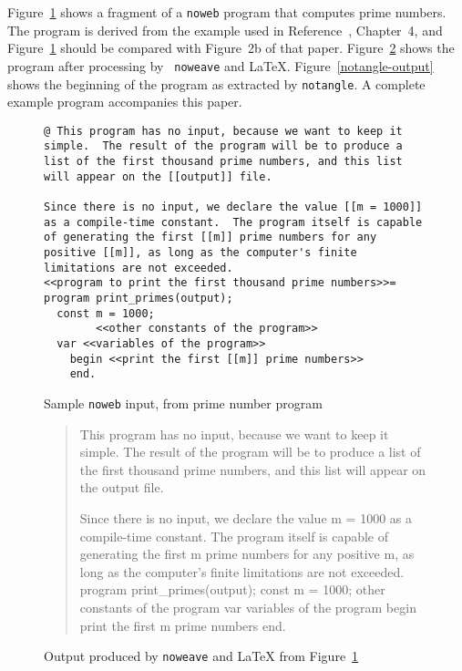 Figure~\ref{sample-input} shows a fragment of a {\tt noweb} program
that computes prime numbers.
The program is derived from the example used in
Reference~, Chapter~4, and Figure~\ref{sample-input} should
be compared with Figure~2b of that paper.
Figure~\ref{noweave-output} shows the program after processing by {\tt
noweave} and {\LaTeX}.
Figure~\ref{notangle-output} shows the beginning of the program as
extracted by {\tt notangle}.
A complete example program accompanies this paper.

\begin{figure}
\begin{verbatim}
@ This program has no input, because we want to keep it
simple.  The result of the program will be to produce a
list of the first thousand prime numbers, and this list
will appear on the [[output]] file.

Since there is no input, we declare the value [[m = 1000]]
as a compile-time constant.  The program itself is capable
of generating the first [[m]] prime numbers for any
positive [[m]], as long as the computer's finite
limitations are not exceeded.
<<program to print the first thousand prime numbers>>=
program print_primes(output);
  const m = 1000;
        <<other constants of the program>>
  var <<variables of the program>>
    begin <<print the first [[m]] prime numbers>>
    end.
\end{verbatim} 
\caption{Sample {\tt noweb} input, from prime number program}
\label{sample-input}
\end{figure}



\begin{figure}
\begin{quote} 

This program has no input, because we want to keep it simple.
The result of the program will be to produce a list of the first
thousand prime numbers, and this list will appear on the \code{}output\edoc{}
file.

Since there is no input, we declare the value \code{}m = 1000\edoc{} as a
compile-time constant.
The program itself is capable of generating the first \code{}m\edoc{} prime
numbers for any positive \code{}m\edoc{}, as long as the computer's finite
limitations are not exceeded.
\enddocs
{}
\endmoddef
program print_primes(output);
  const m = 1000;
        \LA{}other constants of the program\RA{}
  var \LA{}variables of the program\RA{}
    begin \LA{}print the first \code{}m\edoc{} prime numbers\RA{}
    end.
\endcode
\end{quote} 
\caption{Output produced by {\tt noweave} and {\LaTeX} from Figure~\protect\ref{sample-input}}
\label{noweave-output}
\end{figure}

